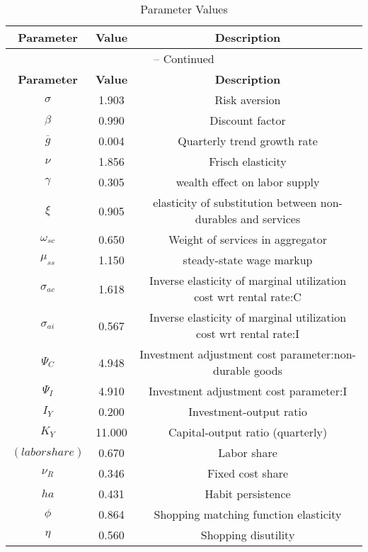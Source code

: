 \begin{center}
\begin{longtable}{ccc}
\caption{Parameter Values}\\%
\toprule%
\multicolumn{1}{c}{\textbf{Parameter}} &
\multicolumn{1}{c}{\textbf{Value}} &
 \multicolumn{1}{c}{\textbf{Description}}\\%
\midrule%
\endfirsthead
\multicolumn{3}{c}{{\tablename} \thetable{} -- Continued}\\%
\midrule%
\multicolumn{1}{c}{\textbf{Parameter}} &
\multicolumn{1}{c}{\textbf{Value}} &
  \multicolumn{1}{c}{\textbf{Description}}\\%
\midrule%
\endhead
${\sigma}$ 	 & 	 1.903 	 & 	 Risk aversion\\
${\beta}$ 	 & 	 0.990 	 & 	 Discount factor\\
${\overline{g}}$ 	 & 	 0.004 	 & 	 Quarterly trend growth rate\\
$\nu$ 	 & 	 1.856 	 & 	 Frisch elasticity\\
$\gamma$ 	 & 	 0.305 	 & 	 wealth effect on labor supply\\
$\xi$ 	 & 	 0.905 	 & 	 elasticity of substitution between non-durables and services\\
$\omega_{sc}$ 	 & 	 0.650 	 & 	 Weight of services in aggregator\\
$\mu_{ss}$ 	 & 	 1.150 	 & 	 steady-state wage markup\\
${\sigma_{ac}}$ 	 & 	 1.618 	 & 	 Inverse elasticity of marginal utilization cost wrt rental rate:C\\
${\sigma_{ai}}$ 	 & 	 0.567 	 & 	 Inverse elasticity of marginal utilization cost wrt rental rate:I\\
${\Psi_{C}}$ 	 & 	 4.948 	 & 	 Investment adjustment cost parameter:non-durable goods\\
${\Psi_I}$ 	 & 	 4.910 	 & 	 Investment adjustment cost parameter:I\\
${I_Y}$ 	 & 	 0.200 	 & 	 Investment-output ratio\\
${K_Y}$ 	 & 	 11.000 	 & 	 Capital-output ratio (quarterly)\\
$(labor share)$ 	 & 	 0.670 	 & 	 Labor share\\
${\nu_R}$ 	 & 	 0.346 	 & 	 Fixed cost share\\
${ha}$ 	 & 	 0.431 	 & 	 Habit persistence\\
${\phi}$ 	 & 	 0.864 	 & 	 Shopping matching function elasticity\\
${\eta}$ 	 & 	 0.560 	 & 	 Shopping disutility\\

\end{longtable}
\end{center}
